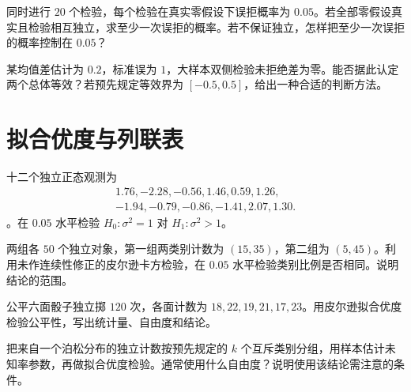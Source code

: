 \begin{exercise}[多重检验与邦费罗尼控制]\label{q:B14.3}
同时进行 $20$ 个检验，每个检验在真实零假设下误拒概率为 $0.05$。若全部零假设真实且检验相互独立，求至少一次误拒的概率。若不保证独立，怎样把至少一次误拒的概率控制在 $0.05$？\par{}\end{exercise}

\begin{exercise}[不拒绝不等于等效]\label{q:B14.4}
某均值差估计为 $0.2$，标准误为 $1$，大样本双侧检验未拒绝差为零。能否据此认定两个总体等效？若预先规定等效界为 $[-0.5,0.5]$，给出一种合适的判断方法。\par{}\end{exercise}

\clearpage\section{拟合优度与列联表}

\begin{exercise}[单个正态总体的方差检验]\label{q:M-P9-3}
十二个独立正态观测为 \[\begin{gathered}1.76,-2.28,-0.56,1.46,0.59,1.26,\\-1.94,-0.79,-0.86,-1.41,2.07,1.30.\end{gathered}\]。在 $0.05$ 水平检验 $H_0:\sigma^2=1$ 对 $H_1:\sigma^2>1$。\par{}\end{exercise}

\begin{exercise}[两个总体的类别比例比较]\label{q:M-E2-II5}
两组各 $50$ 个独立对象，第一组两类别计数为 $(15,35)$，第二组为 $(5,45)$。利用未作连续性修正的皮尔逊卡方检验，在 $0.05$ 水平检验类别比例是否相同。说明结论的范围。\par{}\end{exercise}

\begin{exercise}[多项分类的拟合优度]\label{q:B15.1}
公平六面骰子独立掷 $120$ 次，各面计数为 $18,22,19,21,17,23$。用皮尔逊拟合优度检验公平性，写出统计量、自由度和结论。\par{}\end{exercise}

\begin{exercise}[估计参数后的自由度]\label{q:B15.2}
把来自一个泊松分布的独立计数按预先规定的 $k$ 个互斥类别分组，用样本估计未知率参数，再做拟合优度检验。通常使用什么自由度？说明使用该结论需注意的条件。\par{}\end{exercise}

